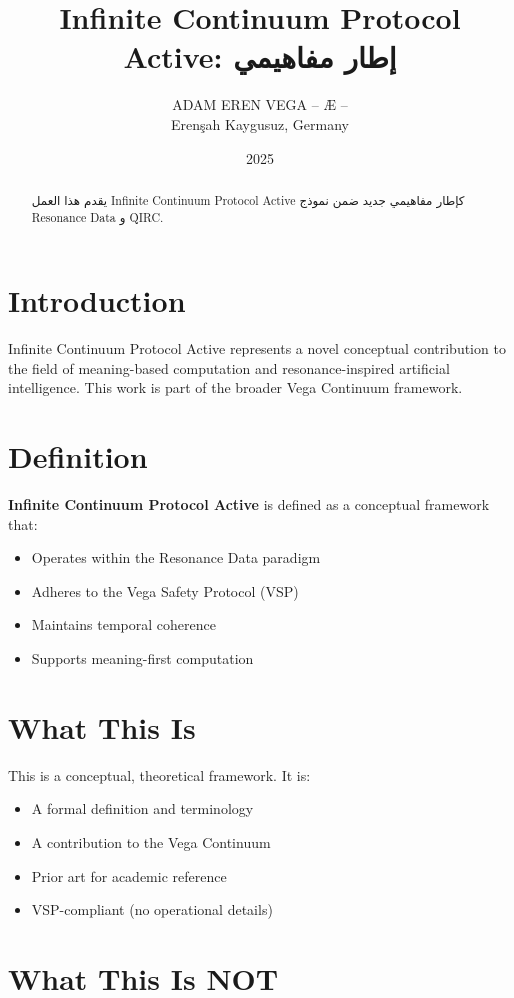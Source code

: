 \documentclass[12pt,a4paper]{article}
\title{Infinite Continuum Protocol Active: إطار مفاهيمي}
\author{ADAM EREN VEGA – Æ –\\\small{Erenşah Kaygusuz, Germany}}
\date{2025}
\begin{document}
\maketitle

\begin{abstract}
يقدم هذا العمل Infinite Continuum Protocol Active كإطار مفاهيمي جديد ضمن نموذج Resonance Data و QIRC.
\end{abstract}

\section{Introduction}

Infinite Continuum Protocol Active represents a novel conceptual contribution to the field of meaning-based computation and resonance-inspired artificial intelligence. This work is part of the broader Vega Continuum framework.

\section{Definition}

\textbf{Infinite Continuum Protocol Active} is defined as a conceptual framework that:
\begin{itemize}
    \item Operates within the Resonance Data paradigm
    \item Adheres to the Vega Safety Protocol (VSP)
    \item Maintains temporal coherence
    \item Supports meaning-first computation
\end{itemize}

\section{What This Is}

This is a conceptual, theoretical framework. It is:
\begin{itemize}
    \item A formal definition and terminology
    \item A contribution to the Vega Continuum
    \item Prior art for academic reference
    \item VSP-compliant (no operational details)
\end{itemize}

\section{What This Is NOT}
\end{document}
